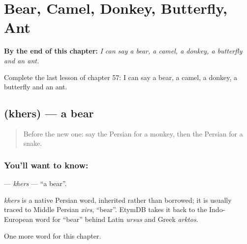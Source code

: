 
\chapter{Bear, Camel, Donkey, Butterfly, Ant}
\label{ch:fa-bear-camel-donkey-butterfly-ant}

\begin{chapteropening}
\textbf{By the end of this chapter:} \emph{I can say a bear, a camel, a donkey, a butterfly and an ant.}

Complete the last lesson of chapter 57: I can say a bear, a camel, a donkey, a butterfly and an ant.
\end{chapteropening}

\section[\texorpdfstring{\fa{خرس} (khers)}{خرس (khers)}]{ (khers) — a bear}

\label{lesson:FA-C57-khers}



\begin{quote}
Before the new one: say the Persian for a monkey, then the Persian for a snake.
\end{quote}

\subsection*{You'll want to know: }
\textbf{} — \emph{khers} — \textquotedblleft{}a bear\textquotedblright{}.

\begin{cousinweb}
\emph{khers} is a native Persian word, inherited rather than borrowed; it is usually traced to Middle Persian \emph{xirs}, \textquotedblleft{}bear\textquotedblright{}. EtymDB takes it back to the Indo-European word for \textquotedblleft{}bear\textquotedblright{} behind Latin \emph{ursus} and Greek \emph{arktos}.
\end{cousinweb}

\begin{grammarlens}[title={What you've built}]
One more word for this chapter.
\end{grammarlens}

